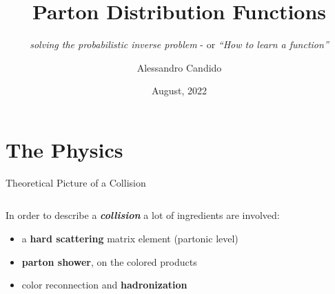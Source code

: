 \documentclass[9pt]{beamer}
\title{Parton Distribution Functions}
\subtitle{
    \textit{solving the probabilistic inverse problem} - or
    \textit{\enquote{How to learn a function}}
}
\date{August, 2022}
\author{Alessandro Candido}
\begin{document}
\maketitle


\section{The Physics}

\begin{frame}{Theoretical Picture of a Collision}
    \begin{columns}
        \begin{column}{0.5\textwidth}
            In order to describe a \textit{\textbf{collision}} a lot of ingredients are
            involved:
            \begin{itemize}
                \item a \textbf{hard scattering} matrix element (partonic level)
                \item \textbf{parton shower}, on the colored products
                \item color reconnection and \textbf{hadronization}
            \end{itemize}


\end{column}
\end{columns}
\end{frame}
\end{document}
